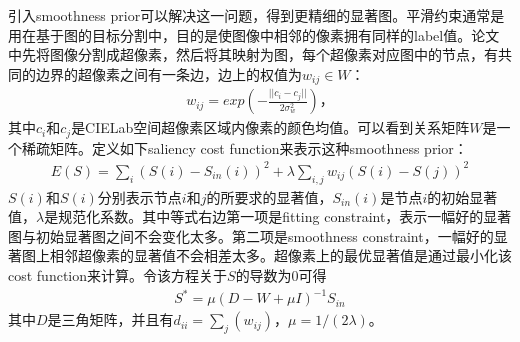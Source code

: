\documentclass[12pt]{article}
\begin{document}
引入smoothness prior可以解决这一问题，得到更精细的显著图。平滑约束通常是用在基于图的目标分割中，目的是使图像中相邻的像素拥有同样的label值。论文中先将图像分割成超像素，然后将其映射为图，每个超像素对应图中的节点，有共同的边界的超像素之间有一条边，边上的权值为$w_{ij} \in W$：
\begin{align}
w_{ij} = exp\left(-\frac{||c_i-c_j||}{2\sigma_w^2}\right)，
\end{align}
其中$c_i$和$c_j$是CIELab空间超像素区域内像素的颜色均值。可以看到关系矩阵$W$是一个稀疏矩阵。定义如下saliency cost function来表示这种smoothness prior：
\begin{align}
E(S) = \sum_i(S(i)-S_{in}(i))^2+\lambda\sum_{i,j}w_{ij}(S(i)-S(j))^2
\end{align}
$S(i)$和$S(i)$分别表示节点$i$和$j$的所要求的显著值，$S_{in}(i)$是节点$i$的初始显著值，$\lambda$是规范化系数。其中等式右边第一项是fitting constraint，表示一幅好的显著图与初始显著图之间不会变化太多。第二项是smoothness constraint，一幅好的显著图上相邻超像素的显著值不会相差太多。超像素上的最优显著值是通过最小化该cost function来计算。令该方程关于$S$的导数为0可得
\begin{align}
S^* = \mu (D-W+\mu I)^{-1}S_{in}
\end{align}
其中$D$是三角矩阵，并且有$d_{ii} = \sum_j (w_{ij})$，$\mu = 1/(2\lambda)$。













%


\end{document}
